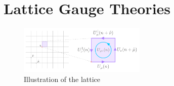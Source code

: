 \documentclass[a4paper,11pt]{article}
\begin{document}
\section{\label{sec:lgt}Lattice Gauge Theories}
%
\begin{figure}
  \begin{center}
    \caption{\label{fig:lattice}Illustration of the lattice}
    \includegraphics[width=0.54\textwidth]{assets/lattice-horizontal1.pdf}
  \end{center}
  \label{fig:lattice}
\end{figure}
%
\end{document}
